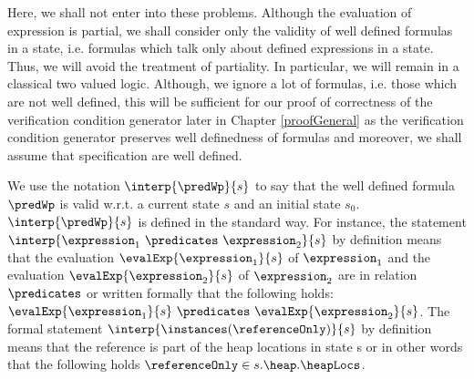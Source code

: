  Here, we shall not enter into these problems. Although the evaluation of expression is partial, we shall consider only the validity of well defined 
 formulas in a state, i.e. formulas which talk only about defined expressions in a state.
 Thus, we will avoid the treatment of partiality. In particular, we will remain in 
 a classical two valued logic. 
 Although, we ignore a lot of formulas, i.e. those which are not well defined,
 this will be sufficient for our proof of correctness of the verification condition generator later in Chapter \ref{proofGeneral} as 
 the verification condition generator preserves well definedness of formulas and moreover, we shall assume that specification are well defined.

 We use the notation $\interp{\predWp}{s}$ to say that the well defined formula  $\predWp$ is valid w.r.t. a current state  $s$ and an initial state $s_0$.
 $\interp{\predWp}{s}$ is defined in the standard way. For instance, the statement $\interp{\expression_1 \  \predicates \  \expression_2 }{s}$
 by definition means that the evaluation   $\evalExp{ \expression_1 }{s } $ of $\expression_1$ and the evaluation $\evalExp{ \expression_2 }{s } $ of $\expression_2$
 are in relation $ \predicates$ or written formally that the following holds:
 $\evalExp{ \expression_1 }{s } \ \predicates \ \evalExp{ \expression_2 }{s}$.
 The formal statement   $\interp{\instances(\referenceOnly)}{s}$  by definition means that the reference  is part of the heap locations in state s or in other words 
 that the following holds  $\referenceOnly \in s.\heap.\heapLocs $.

 



